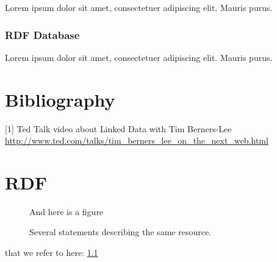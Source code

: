 \documentclass[a4paper,11pt]{kth-mag}
\begin{document}
Lorem ipsum dolor sit amet, consectetuer adipiscing elit. Mauris
purus. 

\subsection{RDF Database}

Lorem ipsum dolor sit amet, consectetuer adipiscing elit. Mauris
purus. 

\chapter*{Bibliography}

[1] Ted Talk video about Linked Data with Tim Berners-Lee \url{http://www.ted.com/talks/tim_berners_lee_on_the_next_web.html}


\appendix
\addappheadtotoc
\chapter{RDF}\label{appA}

\begin{figure}[ht]
\begin{center}
And here is a figure
\caption{\small{Several statements describing the same resource.}}\label{RDF_4}
\end{center}
\end{figure}

that we refer to here: \ref{RDF_4}
\end{document}
